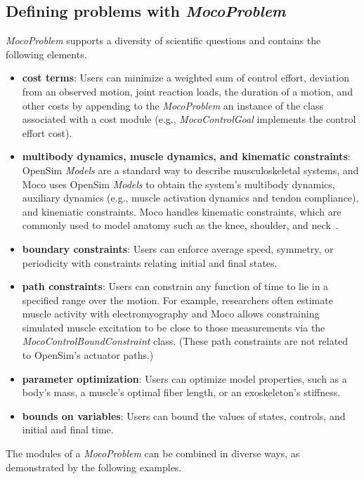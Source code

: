 \documentclass[10pt,letterpaper]{article}
\begin{document}
\subsection*{Defining problems with \textit{MocoProblem}}

\textit{MocoProblem} supports a diversity of scientific questions and contains the following elements.
\begin{itemize}
\item \textbf{cost terms}: Users can minimize a weighted sum of control effort, deviation from an observed motion, joint reaction loads, the duration of a motion, and other costs by appending to the \textit{MocoProblem} an instance of the class associated with a cost module (e.g., \textit{MocoControlGoal} implements the control effort cost).
\item \textbf{multibody dynamics, muscle dynamics, and kinematic constraints}: OpenSim \textit{Models} are a standard way to describe musculoskeletal systems, and Moco uses OpenSim \textit{Models} to obtain the system's multibody dynamics, auxiliary dynamics (e.g., muscle activation dynamics and tendon compliance), and kinematic constraints. Moco handles kinematic constraints, which are commonly used to model anatomy such as the knee, shoulder, and neck~\cite{Seth:2016,Lerner:2015,Rajagopal:2016ek,Cazzola:2017}.
\item \textbf{boundary constraints}: Users can enforce average speed, symmetry, or periodicity with constraints relating initial and final states.
\item \textbf{path constraints}: Users can constrain any function of time to lie in a specified range over the motion. For example, researchers often estimate muscle activity with electromyography and Moco allows constraining simulated muscle excitation to be close to those measurements via the \textit{MocoControlBoundConstraint} class. (These path constraints are not related to OpenSim's actuator paths.)
\item \textbf{parameter optimization}: Users can optimize model properties, such as a body's mass, a muscle's optimal fiber length, or an exoskeleton's stiffness.
\item \textbf{bounds on variables}: Users can bound the values of states, controls, and initial and final time.
\end{itemize}
The modules of a \textit{MocoProblem} can be combined in diverse ways, as demonstrated by the following examples.
\end{document}
